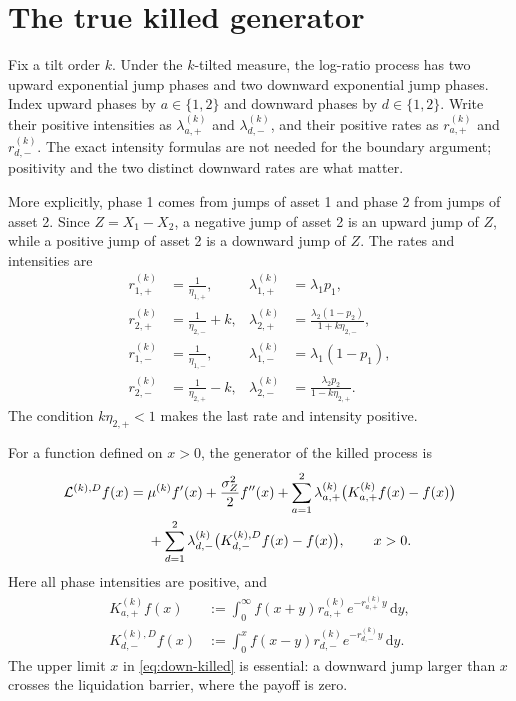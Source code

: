 \documentclass[11pt]{article}
\newcommand{\diff}{\mathrm{d}}
\newcommand{\cL}{\mathcal{L}}
\theoremstyle{plain}
\theoremstyle{remark}
\begin{document}
\section{The true killed generator}

Fix a tilt order $k$.  Under the $k$-tilted measure, the log-ratio process has
two upward exponential jump phases and two downward exponential jump phases.
Index upward phases by $a\in\{1,2\}$ and downward phases by
$d\in\{1,2\}$.  Write their positive intensities as
$\lambda_{a,+}^{(k)}$ and $\lambda_{d,-}^{(k)}$, and their positive rates as
$r_{a,+}^{(k)}$ and $r_{d,-}^{(k)}$.  The exact intensity formulas are not
needed for the boundary argument; positivity and the two distinct downward
rates are what matter.

More explicitly, phase 1 comes from jumps of asset 1 and phase 2 from jumps of
asset 2.  Since $Z=X_1-X_2$, a negative jump of asset 2 is an upward jump of
$Z$, while a positive jump of asset 2 is a downward jump of $Z$.  The rates
and intensities are
\begin{align*}
r_{1,+}^{(k)}&=\frac1{\eta_{1,+}},
&\lambda_{1,+}^{(k)}&=\lambda_1p_1,\\
r_{2,+}^{(k)}&=\frac1{\eta_{2,-}}+k,
&\lambda_{2,+}^{(k)}&=\frac{\lambda_2(1-p_2)}{1+k\eta_{2,-}},\\
r_{1,-}^{(k)}&=\frac1{\eta_{1,-}},
&\lambda_{1,-}^{(k)}&=\lambda_1(1-p_1),\\
r_{2,-}^{(k)}&=\frac1{\eta_{2,+}}-k,
&\lambda_{2,-}^{(k)}&=\frac{\lambda_2p_2}{1-k\eta_{2,+}}.
\end{align*}
The condition $k\eta_{2,+}<1$ makes the last rate and intensity positive.

For a function defined on $x>0$, the generator of the killed process is
\begin{align}
\cL^{(k),D}f(x)
={}&\mu^{(k)}f'(x)+\frac{\sigma_Z^2}{2}f''(x)
 +\sum_{a=1}^2\lambda_{a,+}^{(k)}
       \bigl(K_{a,+}^{(k)}f(x)-f(x)\bigr) \notag\\
&+\sum_{d=1}^2\lambda_{d,-}^{(k)}
       \bigl(K_{d,-}^{(k),D}f(x)-f(x)\bigr),
\qquad x>0.                                      \label{eq:killed-generator}
\end{align}
Here all phase intensities are positive, and
\begin{align}
K_{a,+}^{(k)}f(x)
&:=\int_0^\infty f(x+y)r_{a,+}^{(k)}e^{-r_{a,+}^{(k)}y}\,\diff y,
                                                        \label{eq:up-op}\\
K_{d,-}^{(k),D}f(x)
&:=\int_0^x f(x-y)r_{d,-}^{(k)}e^{-r_{d,-}^{(k)}y}\,\diff y.
                                                        \label{eq:down-killed}
\end{align}
The upper limit $x$ in \eqref{eq:down-killed} is essential: a downward jump
larger than $x$ crosses the liquidation barrier, where the payoff is zero.
\end{document}
